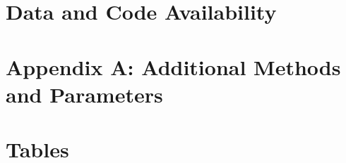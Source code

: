 \documentclass[11pt]{article}
\begin{document}
\section*{Data and Code Availability}

\section*{Appendix A: Additional Methods and Parameters}

%
%
%
%

\renewcommand{\theequation}{A\arabic{equation}}
\renewcommand{\thetable}{A\arabic{table}}
\setcounter{equation}{0}  %
\setcounter{figure}{0}
\setcounter{table}{0}

%
%




\newpage{}

\section*{Tables}
\renewcommand{\thetable}{\arabic{table}}
\setcounter{table}{0}
\end{document}
